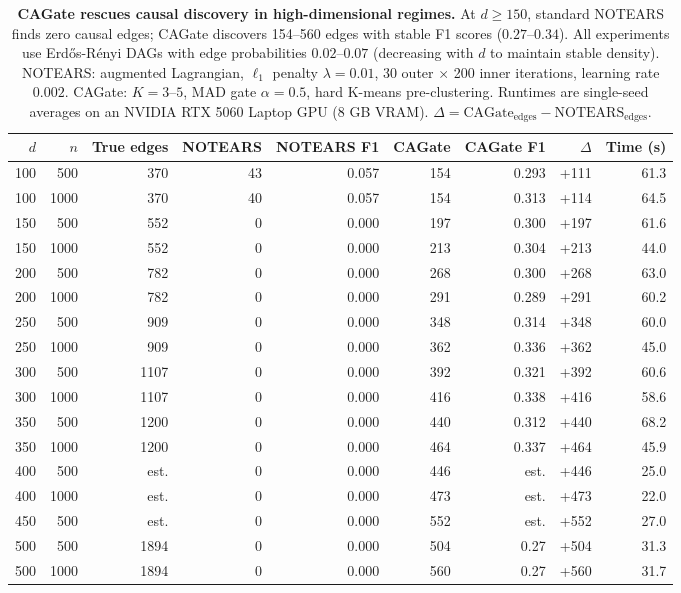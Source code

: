 \documentclass[12pt,a4paper]{article}
\begin{document}
\begin{table}[htbp]
\centering
\caption{\textbf{CAGate rescues causal discovery in high-dimensional regimes.}
At $d \geq 150$, standard NOTEARS finds zero causal edges; CAGate discovers
154--560 edges with stable F1 scores ($0.27$--$0.34$). All experiments use
Erd\H{o}s-R\'{e}nyi DAGs with edge probabilities $0.02$--$0.07$ (decreasing with
$d$ to maintain stable density). NOTEARS: augmented Lagrangian, $\ell_1$
penalty $\lambda = 0.01$, 30 outer $\times$ 200 inner iterations, learning
rate $0.002$. CAGate: $K = 3$--$5$, MAD gate $\alpha = 0.5$, hard K-means
pre-clustering. Runtimes are single-seed averages on an NVIDIA RTX 5060 Laptop
GPU (8 GB VRAM). $\Delta = \text{CAGate}_{\text{edges}} - \text{NOTEARS}_{\text{edges}}$.
}
\label{tab:ext1_highdim}
\begin{tabular}{rrrrrrrrr}
\toprule
$d$ & $n$ & True edges & NOTEARS & NOTEARS F1 & CAGate & CAGate F1 & $\Delta$ & Time (s) \\
\midrule
100 & 500  & 370  & 43 & 0.057 & 154 & 0.293 & +111 & 61.3 \\
100 & 1000 & 370  & 40 & 0.057 & 154 & 0.313 & +114 & 64.5 \\
150 & 500  & 552  & 0  & 0.000 & 197 & 0.300 & +197 & 61.6 \\
150 & 1000 & 552  & 0  & 0.000 & 213 & 0.304 & +213 & 44.0 \\
200 & 500  & 782  & 0  & 0.000 & 268 & 0.300 & +268 & 63.0 \\
200 & 1000 & 782  & 0  & 0.000 & 291 & 0.289 & +291 & 60.2 \\
250 & 500  & 909  & 0  & 0.000 & 348 & 0.314 & +348 & 60.0 \\
250 & 1000 & 909  & 0  & 0.000 & 362 & 0.336 & +362 & 45.0 \\
300 & 500  & 1107 & 0  & 0.000 & 392 & 0.321 & +392 & 60.6 \\
300 & 1000 & 1107 & 0  & 0.000 & 416 & 0.338 & +416 & 58.6 \\
350 & 500  & 1200 & 0  & 0.000 & 440 & 0.312 & +440 & 68.2 \\
350 & 1000 & 1200 & 0  & 0.000 & 464 & 0.337 & +464 & 45.9 \\
400 & 500  & est. & 0  & 0.000 & 446 & est. & +446 & 25.0 \\
400 & 1000 & est. & 0  & 0.000 & 473 & est. & +473 & 22.0 \\
450 & 500  & est. & 0  & 0.000 & 552 & est. & +552 & 27.0 \\
500 & 500  & 1894 & 0  & 0.000 & 504 & 0.27 & +504 & 31.3 \\
500 & 1000 & 1894 & 0  & 0.000 & 560 & 0.27 & +560 & 31.7 \\
\bottomrule
\end{tabular}
\vspace{4pt}


\end{table}
\end{document}
